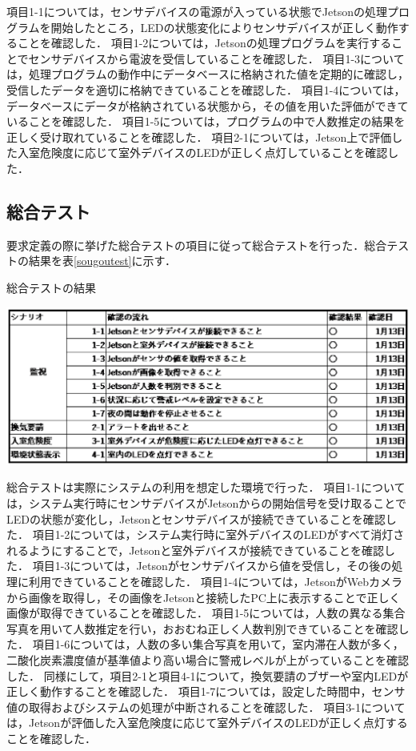 項目1-1については，センサデバイスの電源が入っている状態でJetsonの処理プログラムを開始したところ，LEDの状態変化によりセンサデバイスが正しく動作することを確認した．
項目1-2については，Jetsonの処理プログラムを実行することでセンサデバイスから電波を受信していることを確認した．
項目1-3については，処理プログラムの動作中にデータベースに格納された値を定期的に確認し，受信したデータを適切に格納できていることを確認した．
項目1-4については，データベースにデータが格納されている状態から，その値を用いた評価ができていることを確認した．
項目1-5については，プログラムの中で人数推定の結果を正しく受け取れていることを確認した．
項目2-1については，Jetson上で評価した入室危険度に応じて室外デバイスのLEDが正しく点灯していることを確認した．

\subsection{総合テスト}

要求定義の際に挙げた総合テストの項目に従って総合テストを行った．総合テストの結果を表\ref{sougoutest}に示す．

\begin{table}
	\centering
	\caption{総合テストの結果}
	\label{sougoutest}
	\includegraphics[width=0.9\linewidth]{test/sougoutest}
\end{table}

総合テストは実際にシステムの利用を想定した環境で行った．
項目1-1については，システム実行時にセンサデバイスがJetsonからの開始信号を受け取ることでLEDの状態が変化し，Jetsonとセンサデバイスが接続できていることを確認した．
項目1-2については，システム実行時に室外デバイスのLEDがすべて消灯されるようにすることで，Jetsonと室外デバイスが接続できていることを確認した．
項目1-3については，Jetsonがセンサデバイスから値を受信し，その後の処理に利用できていることを確認した．
項目1-4については，JetsonがWebカメラから画像を取得し，その画像をJetsonと接続したPC上に表示することで正しく画像が取得できていることを確認した．
項目1-5については，人数の異なる集合写真を用いて人数推定を行い，おおむね正しく人数判別できていることを確認した．
項目1-6については，人数の多い集合写真を用いて，室内滞在人数が多く，二酸化炭素濃度値が基準値より高い場合に警戒レベルが上がっていることを確認した．
同様にして，項目2-1と項目4-1について，換気要請のブザーや室内LEDが正しく動作することを確認した．
項目1-7については，設定した時間中，センサ値の取得およびシステムの処理が中断されることを確認した．
項目3-1については，Jetsonが評価した入室危険度に応じて室外デバイスのLEDが正しく点灯することを確認した．